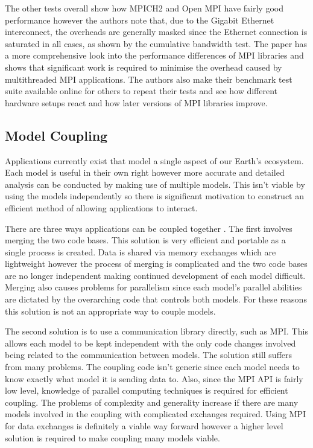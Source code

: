 \documentclass{acm_proc_article-sp}
\begin{document}
The other tests overall show how MPICH2 and Open MPI have fairly good
performance however the authors note that, due to the Gigabit Ethernet
interconnect, the overheads are generally masked since the Ethernet connection
is saturated in all cases, as shown by the cumulative bandwidth test. The paper
has a more comprehensive look into the performance differences of MPI libraries
and shows that significant work is required to minimise the overhead caused by
multithreaded MPI applications. The authors also make their benchmark test suite
available online for others to repeat their tests and see how different hardware
setups react and how later versions of MPI libraries improve.

\subsection{Model Coupling}

Applications currently exist that model a single aspect of our Earth's
ecosystem. Each model is useful in their own right however more accurate and
detailed analysis can be conducted by making use of multiple models. This isn't
viable by using the models independently so there is significant motivation to
construct an efficient method of allowing applications to interact.

There are three ways applications can be coupled together \cite{Thevenin}. The
first involves merging the two code bases. This solution is very efficient and
portable as a single process is created. Data is shared via memory exchanges
which are lightweight however the process of merging is complicated and the two
code bases are no longer independent making continued development of each model
difficult. Merging also causes problems for parallelism since each model's
parallel abilities are dictated by the overarching code that controls both
models. For these reasons this solution is not an appropriate way to couple
models.

The second solution \cite{Thevenin} is to use a communication library directly,
such as MPI. This allows each model to be kept independent with the only code
changes involved being related to the communication between models. The solution
still suffers from many problems. The coupling code isn't generic since each
model needs to know exactly what model it is sending data to. Also, since the
MPI API is fairly low level, knowledge of parallel computing techniques is
required for efficient coupling. The problems of complexity and generality
increase if there are many models involved in the coupling with complicated
exchanges required. Using MPI for data exchanges is definitely a viable way
forward however a higher level solution is required to make coupling many models
viable.
\end{document}

